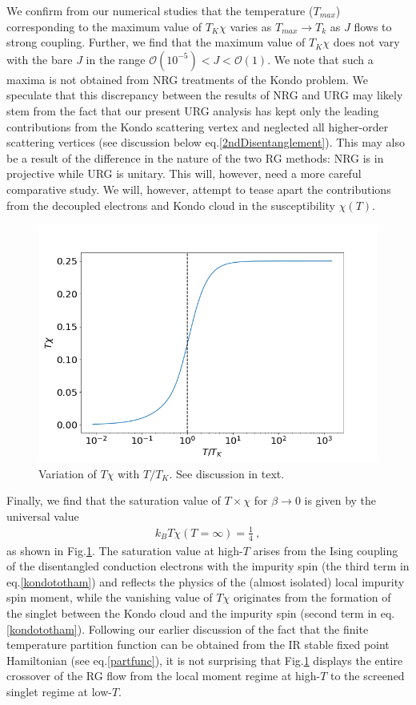\documentclass[aps,prb,preprint,groupedaddress]{revtex4-2}
\begin{document}
We confirm from our numerical studies that the temperature ($T_{max}$) corresponding to the maximum value of $T_{K}\chi$ varies as $T_{max}\to T_{k}$ as $J$ flows to strong coupling. Further, we find that the maximum value of $T_{K}\chi$ does not vary with the bare $J$ in the range $\mathcal{O}(10^{-5})<J<\mathcal{O}(1)$. We note that such a maxima is not obtained from NRG treatments of the Kondo problem. We speculate that this discrepancy between the results of NRG and URG may likely stem from the fact that our present URG analysis has kept only the leading contributions from the Kondo scattering vertex and neglected all higher-order scattering vertices (see discussion below eq.\eqref{2ndDisentanglement}). This may also be a result of the difference in the nature of the two RG methods: NRG is in projective while URG is unitary. This will, however, need a more careful comparative study. We will, however, attempt to tease apart the contributions from the decoupled electrons and Kondo cloud in the susceptibility $\chi (T)$.
\begin{figure}[ht!]
\begin{center}
\includegraphics[scale=0.5]{SusceptibilityVsTemp2.png}
\end{center}
\caption{Variation of $T\chi$ with $T/T_{K}$. See discussion in text.}\label{suscfig2}
\end{figure}
\par\noindent
Finally, we find that the saturation value of $T\times\chi$ for $\beta\to 0$ is given by the universal value
\begin{eqnarray}
k_{B}T\chi(T=\infty)=\frac{1}{4}~,
\end{eqnarray}
as shown in Fig.\ref{suscfig2}. The saturation value at high-$T$ arises from the Ising coupling of the disentangled conduction electrons with the impurity spin (the third term in eq.\eqref{kondototham}) and reflects the physics of the (almost isolated) local impurity spin moment, while the vanishing value of $T\chi$ originates from the formation of the singlet between the Kondo cloud and the impurity spin (second term in eq.\eqref{kondototham}). Following our earlier discussion of the fact that the finite temperature partition function can be obtained from the IR stable fixed point Hamiltonian (see eq.\eqref{partfunc}), it is not surprising that Fig.\ref{suscfig2} displays the entire crossover of the RG flow from the local moment regime at high-$T$ to the screened singlet regime at low-$T$.
\end{document}

